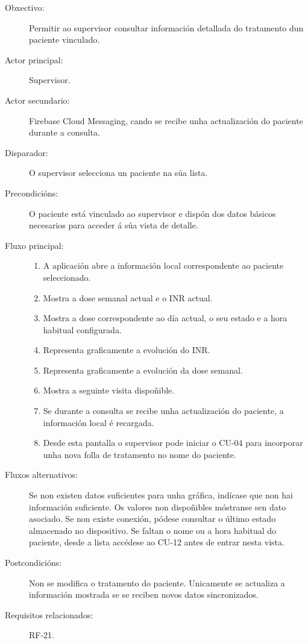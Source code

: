 \begin{description}

\item[Obxectivo:] Permitir ao supervisor consultar información detallada do
tratamento dun paciente vinculado.

\item[Actor principal:] Supervisor.

\item[Actor secundario:] Firebase Cloud Messaging, cando se recibe unha
actualización do paciente durante a consulta.

\item[Disparador:] O supervisor selecciona un paciente na súa lista.

\item[Precondicións:] O paciente está vinculado ao supervisor e dispón dos datos
básicos necesarios para acceder á súa vista de detalle.

\item[Fluxo principal:] \hfill
\begin{enumerate}
    \item A aplicación abre a información local correspondente ao paciente
    seleccionado.

    \item Mostra a dose semanal actual e o INR actual.

    \item Mostra a dose correspondente ao día actual, o seu estado e a hora
    habitual configurada.

    \item Representa graficamente a evolución do INR.

    \item Representa graficamente a evolución da dose semanal.

    \item Mostra a seguinte visita dispoñible.

    \item Se durante a consulta se recibe unha actualización do paciente, a
    información local é recargada.

    \item Desde esta pantalla o supervisor pode iniciar o CU-04 para incorporar
    unha nova folla de tratamento no nome do paciente.
\end{enumerate}

\item[Fluxos alternativos:] Se non existen datos suficientes para unha gráfica,
indícase que non hai información suficiente. Os valores non dispoñibles
móstranse sen dato asociado. Se non existe conexión, pódese consultar o último
estado almacenado no dispositivo. Se faltan o nome ou a hora habitual do
paciente, desde a lista accédese ao CU-12 antes de entrar nesta vista.

\item[Postcondicións:] Non se modifica o tratamento do paciente. Unicamente se
actualiza a información mostrada se se reciben novos datos sincronizados.

\item[Requisitos relacionados:] RF-21.

\end{description}


